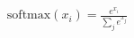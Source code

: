 \documentclass[preview]{standalone}
\begin{document}
\begin{align*}
\text{softmax}(x_i) = \frac{e^{x_i}}{\sum_{j} e^{x_j}}
\end{align*}
\end{document}
